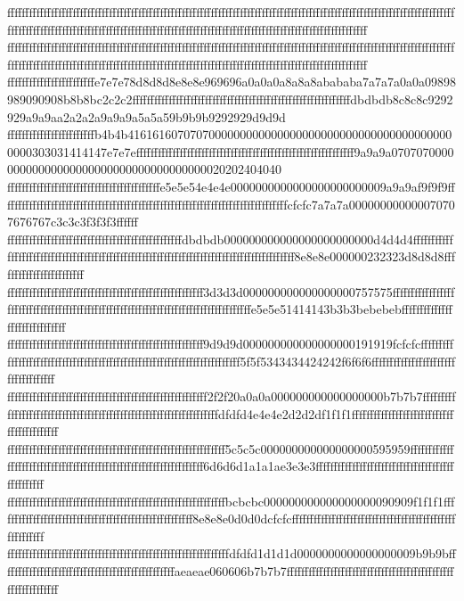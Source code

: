 {{{ffffffffffffffffffffffffffffffffffffffffffffffffffffffffffffffffffffffffffffffffffffffffffffffffffffffffffffffffffffffffffffffffffffffffffffffffffffffffffffffffffffffffffffffffffffffffffffffffffffffffffffffffffffffffffffff
ffffffffffffffffffffffffffffffffffffffffffffffffffffffffffffffffffffffffffffffffffffffffffffffffffffffffffffffffffffffffffffffffffffffffffffffffffffffffffffffffffffffffffffffffffffffffffffffffffffffffffffffffffffffffffffff
ffffffffffffffffffffffffe7e7e78d8d8d8e8e8e969696a0a0a0a8a8a8abababa7a7a7a0a0a09898989090908b8b8bc2c2c2ffffffffffffffffffffffffffffffffffffffffffffffffffffffffffffdbdbdb8c8c8c9292929a9a9aa2a2a2a9a9a9a5a5a59b9b9b9292929d9d9d
ffffffffffffffffffffffffb4b4b41616160707070000000000000000000000000000000000000000000303031414147e7e7effffffffffffffffffffffffffffffffffffffffffffffffffffffffffff9a9a9a070707000000000000000000000000000000000000020202404040
ffffffffffffffffffffffffffffffffffffffffffe5e5e54e4e4e0000000000000000000000009a9a9af9f9f9fffffffffffffffffffffffffffffffffffffffffffffffffffffffffffffffffffffffffffffffcfcfc7a7a7a000000000000070707676767c3c3c3f3f3f3ffffff
ffffffffffffffffffffffffffffffffffffffffffffffffdbdbdb000000000000000000000000d4d4d4ffffffffffffffffffffffffffffffffffffffffffffffffffffffffffffffffffffffffffffffffffffffffff8e8e8e000000232323d8d8d8ffffffffffffffffffffffff
ffffffffffffffffffffffffffffffffffffffffffffffffffffff3d3d3d000000000000000000757575ffffffffffffffffffffffffffffffffffffffffffffffffffffffffffffffffffffffffffffffffffffe5e5e51414143b3b3bebebebffffffffffffffffffffffffffffff
ffffffffffffffffffffffffffffffffffffffffffffffffffffff9d9d9d000000000000000000191919fcfcfcfffffffffffffffffffffffffffffffffffffffffffffffffffffffffffffffffffffffff5f5f5343434424242f6f6f6ffffffffffffffffffffffffffffffffffff
fffffffffffffffffffffffffffffffffffffffffffffffffffffff2f2f20a0a0a000000000000000000b7b7b7fffffffffffffffffffffffffffffffffffffffffffffffffffffffffffffffffffdfdfd4e4e4e2d2d2df1f1f1ffffffffffffffffffffffffffffffffffffffffff
ffffffffffffffffffffffffffffffffffffffffffffffffffffffffffff5c5c5c000000000000000000595959ffffffffffffffffffffffffffffffffffffffffffffffffffffffffffffffffff6d6d6d1a1a1ae3e3e3ffffffffffffffffffffffffffffffffffffffffffffffff
ffffffffffffffffffffffffffffffffffffffffffffffffffffffffffffbcbcbc000000000000000000090909f1f1f1ffffffffffffffffffffffffffffffffffffffffffffffffffffff8e8e8e0d0d0dcfcfcfffffffffffffffffffffffffffffffffffffffffffffffffffffff
fffffffffffffffffffffffffffffffffffffffffffffffffffffffffffffdfdfd1d1d1d0000000000000000009b9b9bffffffffffffffffffffffffffffffffffffffffffffffffaeaeae060606b7b7b7ffffffffffffffffffffffffffffffffffffffffffffffffffffffffffff
}}}
